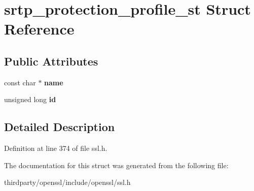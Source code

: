 \hypertarget{structsrtp__protection__profile__st}{}\section{srtp\+\_\+protection\+\_\+profile\+\_\+st Struct Reference}
\label{structsrtp__protection__profile__st}
\subsection*{Public Attributes}
\begin{DoxyCompactItemize}
\item 
\mbox{\label{structsrtp__protection__profile__st_a395750555b1a21494c68b99bea8067e8}} 
const char $\ast$ {\bfseries name}
\item 
\mbox{\label{structsrtp__protection__profile__st_a8befcbb11f8a31c6a75e8d44e5618a00}} 
unsigned long {\bfseries id}
\end{DoxyCompactItemize}


\subsection{Detailed Description}


Definition at line 374 of file ssl.\+h.



The documentation for this struct was generated from the following file\+:\begin{DoxyCompactItemize}
\item 
thirdparty/openssl/include/openssl/ssl.\+h\end{DoxyCompactItemize}

